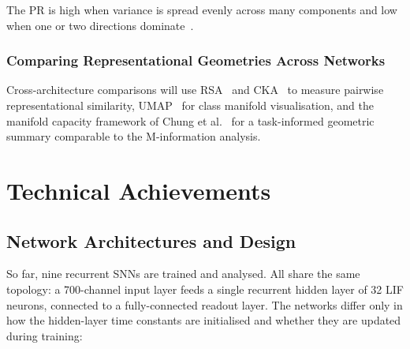 \documentclass[12pt,twoside]{report}
\begin{document}
The PR is high when variance is spread evenly across many components and low when one
or two directions dominate~\cite{wakhloo2026}.

\subsection{Comparing Representational Geometries Across Networks}

Cross-architecture comparisons will use RSA~\cite{kriegeskorte2008} and
CKA~\cite{kornblith2019} to measure pairwise representational similarity,
UMAP~\cite{mcinnes2018} for class manifold visualisation, and the manifold
capacity framework of Chung et al.~\cite{chung2018} for a task-informed
geometric summary comparable to the M-information analysis.


\chapter{Technical Achievements}
\label{chap:achiev}

\section{Network Architectures and Design}
\label{sec:architectures}

So far, nine recurrent SNNs are trained and analysed. All share the same topology: a 
700-channel input layer feeds a single recurrent hidden layer of 32 LIF neurons, 
connected to a fully-connected readout layer. The networks differ only in how 
the hidden-layer time constants are initialised and whether they are updated 
during training:
\end{document}
